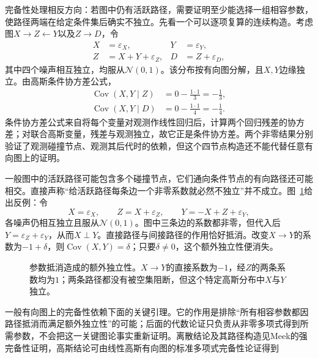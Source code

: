 完备性处理相反方向：若图中仍有活跃路径，需要证明至少能选择一组相容参数，使路径两端在给定条件集后确实不独立。先看一个可以逐项复算的连续构造。考虑图$X\to Z\leftarrow Y$以及$Z\to D$，令
\[
  \begin{aligned}
    X&=\varepsilon_X,& Y&=\varepsilon_Y,\\
    Z&=X+Y+\varepsilon_Z,& D&=Z+\varepsilon_D,
  \end{aligned}
\]
其中四个噪声相互独立，均服从$\mathcal{N}(0,1)$。该分布按有向图分解，且$X,Y$边缘独立。由高斯条件协方差公式，
\[
  \begin{aligned}
    \operatorname{Cov}(X,Y\mid Z)
      &=0-\frac{1\cdot1}{3}=-\frac13,\\
    \operatorname{Cov}(X,Y\mid D)
      &=0-\frac{1\cdot1}{4}=-\frac14.
  \end{aligned}
\]
条件协方差公式来自将每个变量对观测作线性回归后，计算两个回归残差的协方差；对联合高斯变量，残差与观测独立，故它正是条件协方差。两个非零结果分别验证了观测碰撞节点、观测其后代时的依赖，但这个四节点构造还不能代替任意有向图上的证明。

一般图中的活跃路径可能包含多个碰撞节点，它们通向条件节点的有向路径还可能相交。直接声称“给活跃路径每条边一个非零系数就必然不独立”并不成立。图~\ref{fig:pgm-directed-cancellation}给出反例：令
\[
  X=\varepsilon_X,\qquad
  Z=X+\varepsilon_Z,\qquad
  Y=-X+Z+\varepsilon_Y,
\]
各噪声仍相互独立且服从$\mathcal N(0,1)$。图中三条边的系数都非零，但代入后$Y=\varepsilon_Z+\varepsilon_Y$，从而$X\perp Y$。直接路径与间接路径的作用恰好抵消。改变$X\to Y$的系数为$-1+\delta$，则$\operatorname{Cov}(X,Y)=\delta$；只要$\delta\ne0$，这个额外独立性便消失。

\begin{figure}[htbp]
  \centering
  
  \caption{参数抵消造成的额外独立性。$X\to Y$的直接系数为$-1$，经$Z$的两条系数均为$1$；两条路径都没有被空集阻断，但这个特定高斯分布中$X$与$Y$独立。}
  \label{fig:pgm-directed-cancellation}
\end{figure}

一般有向图上的完备性依赖下面的关键引理。它的作用是排除“所有相容参数都因路径抵消而满足额外独立性”的可能；后面的代数论证只负责从非零多项式得到所需参数，不会把这一关键图论事实重新证明。离散结论及其路径构造见Meek的强完备性证明，高斯结论可由线性高斯有向图的标准多项式完备性论证得到

